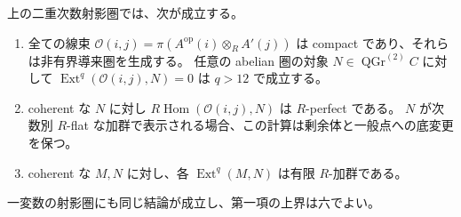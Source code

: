 \begin{lemma}
\label{mix:lem:h-projective-product}
上の二重次数射影圏では、次が成立する。
\begin{enumerate}
 \item 全ての線束
 $\mathcal O(i,j)=\pi(A^{\mathrm{op}}(i)\otimes_RA'(j))$
 は compact であり、それらは非有界導来圏を生成する。
 任意の abelian 圏の対象 $N\in\operatorname{QGr}^{(2)}C$ に対して
 $\operatorname{Ext}^q(\mathcal O(i,j),N)=0$ は $q>12$ で成立する。
 \item coherent な $N$ に対し
 $R\operatorname{Hom}(\mathcal O(i,j),N)$ は $R$-perfect である。
 $N$ が次数別 $R$-flat な加群で表示される場合、この計算は剰余体と一般点への底変更を保つ。
 \item coherent な $M,N$ に対し、各
 $\operatorname{Ext}^q(M,N)$ は有限 $R$-加群である。
\end{enumerate}
一変数の射影圏にも同じ結論が成立し、第一項の上界は六でよい。
\end{lemma}

